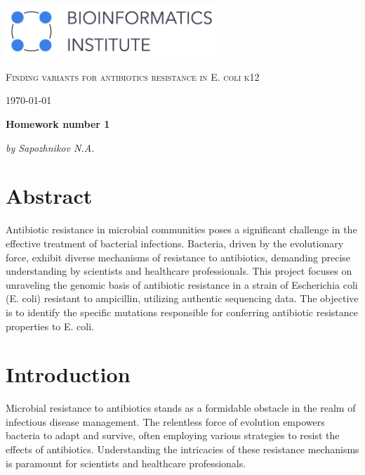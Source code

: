 \documentclass{article}
\begin{document}
\begin{titlepage}
	\centering
	\includegraphics[width=0.6\textwidth]{Graphics/BI_logo.png}\par
	\vspace{5cm}

	{\scshape\huge Finding variants for antibiotics resistance in E. coli k12\par} 
	\vspace{1cm}
	{\Large \today\par}
	\vfill
	
	{\huge\bfseries Homework number 1\par}
	\vfill
	
	{\Large\itshape by Sapozhnikov N.A.}\par
	\vspace{1.5cm}

	\vfill


	\vfill
\end{titlepage}

\newpage

\section{Abstract}
Antibiotic resistance in microbial communities poses a significant challenge in the effective treatment of bacterial infections. Bacteria, driven by the evolutionary force, exhibit diverse mechanisms of resistance to antibiotics, demanding precise understanding by scientists and healthcare professionals. This project focuses on unraveling the genomic basis of antibiotic resistance in a strain of Escherichia coli (E. coli) resistant to ampicillin, utilizing authentic sequencing data. The objective is to identify the specific mutations responsible for conferring antibiotic resistance properties to E. coli.

\section{Introduction}
Microbial resistance to antibiotics stands as a formidable obstacle in the realm of infectious disease management. The relentless force of evolution empowers bacteria to adapt and survive, often employing various strategies to resist the effects of antibiotics. Understanding the intricacies of these resistance mechanisms is paramount for scientists and healthcare professionals.
\end{document}
